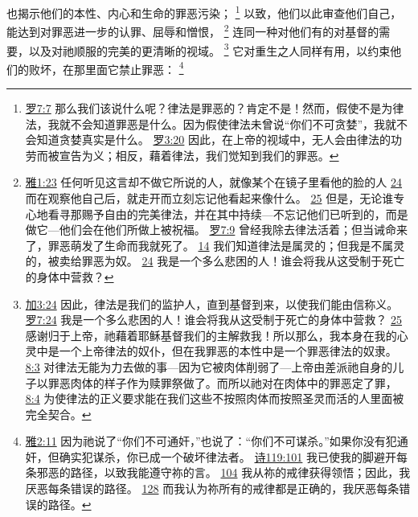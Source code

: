 \documentclass[12pt, a4paper, oneside]{ctexart}
\begin{document}
	也揭示他们的本性、内心和生命的罪恶污染；
	\footnote {
		\href{https://biblehub.com/romans/7-7.htm}{罗7:7} 那么我们该说什么呢？律法是罪恶的？肯定不是！然而，假使不是为律法，我就不会知道罪恶是什么。因为假使律法未曾说“你们不可贪婪”，我就不会知道贪婪真实是什么。
		\href{https://biblehub.com/romans/3-20.htm}{罗3:20} 因此，在上帝的视域中，无人会由律法的功劳而被宣告为义；相反，藉着律法，我们觉知到我们的罪恶。
	}
	以致，他们以此审查他们自己，能达到对罪恶进一步的认罪、屈辱和憎恨，
	\footnote {
		\href{https://biblehub.com/james/1-23.htm}{雅1:23} 任何听见这言却不做它所说的人，就像某个在镜子里看他的脸的人
		\href{https://biblehub.com/james/1-24.htm}{24} 而在观察他自己后，就走开而立刻忘记他看起来像什么。
		\href{https://biblehub.com/james/1-25.htm}{25} 但是，无论谁专心地看寻那赐予自由的完美律法，并在其中持续---不忘记他们已听到的，而是做它---他们会在他们所做上被祝福。
		\href{https://biblehub.com/romans/7-9.htm}{罗7:9} 曾经我除去律法活着；但当诫命来了，罪恶萌发了生命而我就死了。
		\href{https://biblehub.com/romans/7-14.htm}{14} 我们知道律法是属灵的；但我是不属灵的，被卖给罪恶为奴。
		\href{https://biblehub.com/romans/7-24.htm}{24} 我是一个多么悲困的人！谁会将我从这受制于死亡的身体中营救？
	}
	连同一种对他们有的对基督的需要，以及对祂顺服的完美的更清晰的视域。
	\footnote {
		\href{https://biblehub.com/galatians/3-24.htm}{加3:24} 因此，律法是我们的监护人，直到基督到来，以使我们能由信称义。
		\href{https://biblehub.com/romans/7-24.htm}{罗7:24} 我是一个多么悲困的人！谁会将我从这受制于死亡的身体中营救？
		\href{https://biblehub.com/romans/7-25.htm}{25} 感谢归于上帝，祂藉着耶稣基督我们的主解救我！所以那么，我本身在我的心灵中是一个上帝律法的奴仆，但在我罪恶的本性中是一个罪恶律法的奴隶。
		\href{https://biblehub.com/romans/8-3.htm}{8:3} 对律法无能为力去做的事---因为它被肉体削弱了---上帝由差派祂自身的儿子以罪恶肉体的样子作为赎罪祭做了。而所以祂对在肉体中的罪恶定了罪，
		\href{https://biblehub.com/romans/8-4.htm}{8:4} 为使律法的正义要求能在我们这些不按照肉体而按照圣灵而活的人里面被完全契合。
	}
	它对重生之人同样有用，以约束他们的败坏，在那里面它禁止罪恶：
	\footnote {
		\href{https://biblehub.com/james/2-11.htm}{雅2:11} 因为祂说了“你们不可通奸，”也说了：“你们不可谋杀。”如果你没有犯通奸，但确实犯谋杀，你已成一个破坏律法者。
		\href{https://biblehub.com/psalms/119-101.htm}{诗119:101} 我已使我的脚避开每条邪恶的路径，以致我能遵守祢的言。
		\href{https://biblehub.com/psalms/119-104.htm}{104} 我从祢的戒律获得领悟；因此，我厌恶每条错误的路径。
		\href{https://biblehub.com/psalms/119-128.htm}{128} 而我认为祢所有的戒律都是正确的，我厌恶每条错误的路径。
	}
\end{document}
